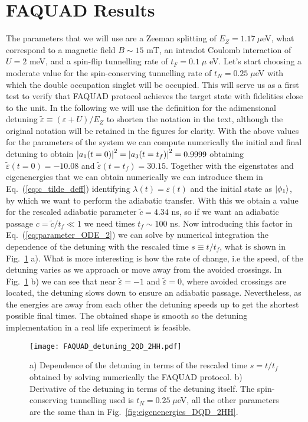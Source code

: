 \section{FAQUAD Results}
The parameters that we will use are a Zeeman splitting of $E_Z=1.17\: \mu$eV, what correspond to a magnetic field $B\sim 15$ mT, an intradot Coulomb interaction of $U= 2$ meV, and a spin-flip tunnelling rate of $t_F=0.1\; \mu$ eV. Let's start choosing a moderate value for the spin-conserving tunnelling rate of $t_N=0.25\; \mu$eV with which the double occupation singlet will be occupied. This will serve us as a first test to verify that FAQUAD protocol achieves the target state with fidelities close to the unit. In the following we will use the definition for the adimensional detuning $\tilde{\varepsilon}\equiv (\varepsilon+U)/E_Z$ to shorten the notation in the text, although the original notation will be retained in the figures for clarity. With the above values for the parameters of the system we can compute numerically the initial and final detuning to obtain $\abs{a_1(t=0)}^2=\abs{a_3(t=t_f)}^2=0.9999$ obtaining $\tilde{\varepsilon}(t=0)=-10.08$ and $\tilde{\varepsilon}(t=t_f)=30.15$. Together with the eigenstates and eigenenergies that we can obtain numerically we can introduce them in Eq.~(\ref{eq:c_tilde_deff}) identifying $\lambda(t)=\varepsilon(t)$ and the initial state as $\ket{\phi_1}$, by which we want to perform the adiabatic transfer. With this we obtain a value for the rescaled adiabatic parameter $\tilde{c}=4.34$ ns, so if we want an adiabatic passage $c=\tilde{c}/t_f\ll 1$ we need times $t_f\sim 100$ ns. Now introducing this factor in Eq.~(\ref{eq:parameter_ODE_2}) we can solve by numerical integration the dependence of the detuning with the rescaled time $s\equiv t/t_f$, what is shown in Fig.~\ref{fig:FAQUAD_detuning_2QD_2HH} a). What is more interesting is how the rate of change, i.e the speed, of the detuning varies as we approach or move away from the avoided crossings. In Fig.~\ref{fig:FAQUAD_detuning_2QD_2HH} b) we can see that near $\tilde{\varepsilon}=-1$ and $\tilde{\varepsilon}=0$, where avoided crossings are located, the detuning slows down to ensure an adiabatic passage. Nevertheless, as the energies are away from each other the detuning speeds up to get the shortest possible final times. The obtained shape is smooth so the detuning implementation in a real life experiment is feasible.
\begin{figure}[!htbp]
	\centering
	\texttt{[image: FAQUAD\_detuning\_2QD\_2HH.pdf]}
	\caption{a) Dependence of the detuning in terms of the rescaled time $s=t/t_f$ obtained by solving numerically the FAQUAD protocol. b) Derivative of the detuning in terms of the detuning itself. The spin-conserving tunnelling used is $t_N=0.25\; \mu$eV, all the other parameters are the same than in Fig.~\ref{fig:eigenenergies_DQD_2HH}.}
	\label{fig:FAQUAD_detuning_2QD_2HH}
\end{figure}

